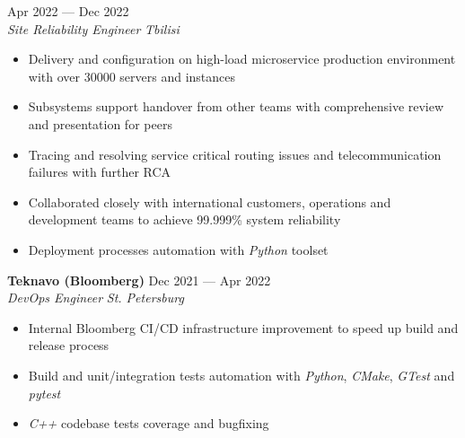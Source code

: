 \documentclass[10pt]{report}
\newenvironment{JobDescription}[5]{
    \vspace{ #5 }
    \flushleft
    {\bf #1 } \hfill { #2 }
    \\
    {\em #3 } \hfill {\em #4 }
    \begin{itemize}
} {
    \end{itemize}
}
\begin{document}
\begin{JobDescription}{}{Apr 2022 --- Dec 2022}{Site Reliability Engineer}{Tbilisi}{-3mm}
    \item Delivery and configuration on high-load microservice production environment with over 30000 servers and instances
    \item Subsystems support handover from other teams with comprehensive review and presentation for peers
    \item Tracing and resolving service critical routing issues and telecommunication failures with further RCA
    \item Collaborated closely with international customers, operations and development teams to achieve 99.999\% system reliability
    \item Deployment processes automation with \emph{Python} toolset
\end{JobDescription}

\begin{JobDescription}{Teknavo (Bloomberg)}{Dec 2021 --- Apr 2022}{DevOps Engineer}{St. Petersburg}{5mm}
    \item Internal Bloomberg CI/CD infrastructure improvement to speed up build and release process
    \item Build and unit/integration tests automation with \emph{Python}, \emph{CMake}, \emph{GTest} and \emph{pytest}
    \item \emph{C++} codebase tests coverage and bugfixing
\end{JobDescription}

\goodbreak
\end{document}
